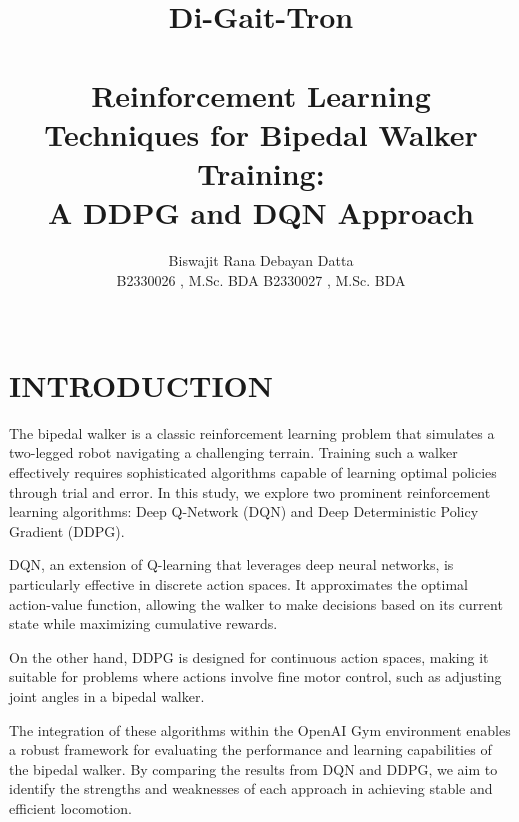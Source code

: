 \documentclass[letterpaper]{article}
\begin{document}
%
\title{{\huge Di-Gait-Tron}\\ \\Reinforcement Learning Techniques for Bipedal Walker Training: \\A DDPG and DQN Approach{}}
\author{Biswajit Rana \hspace{2em} Debayan Datta\\
B2330026 , M.Sc. BDA \hspace{0em}\hspace{2em} B2330027 , M.Sc. BDA \\
\\
}
\maketitle

\section{INTRODUCTION}
\vspace{1em}

The bipedal walker is a classic reinforcement learning problem that simulates a two-legged robot navigating a challenging terrain. Training such a walker effectively requires sophisticated algorithms capable of learning optimal policies through trial and error. In this study, we explore two prominent reinforcement learning algorithms: Deep Q-Network (DQN) and Deep Deterministic Policy Gradient (DDPG).

DQN, an extension of Q-learning that leverages deep neural networks, is particularly effective in discrete action spaces. It approximates the optimal action-value function, allowing the walker to make decisions based on its current state while maximizing cumulative rewards. 

On the other hand, DDPG is designed for continuous action spaces, making it suitable for problems where actions involve fine motor control, such as adjusting joint angles in a bipedal walker.

The integration of these algorithms within the OpenAI Gym environment enables a robust framework for evaluating the performance and learning capabilities of the bipedal walker. By comparing the results from DQN and DDPG, we aim to identify the strengths and weaknesses of each approach in achieving stable and efficient locomotion.
\end{document}
